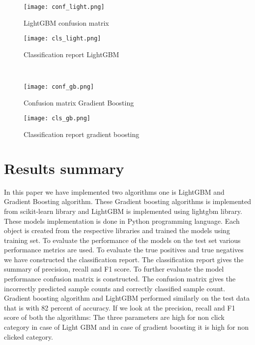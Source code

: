 \documentclass[conference]{IEEEtran}
\begin{document}
\begin{figure}[!ht]
     \centering
     \texttt{[image: conf\_light.png]}
     \caption{LightGBM confusion matrix}
     \label{fig:8}
 \end{figure}


\begin{figure}[!h]
     \centering
     \texttt{[image: cls\_light.png]}
     \caption{Classification report LightGBM }
     \label{fig:8}
 \end{figure}
 
\\

\begin{figure}[!h]
     \centering
     \texttt{[image: conf\_gb.png]}
     \caption{Confusion matrix Gradient Boosting}
     \label{fig:8}
 \end{figure}
 
 
 
  \begin{figure}[!ht]
     \centering
     \texttt{[image: cls\_gb.png]}
     \caption{Classification report gradient boosting}
     \label{fig:8}
 \end{figure}


 
\newpage
\section{Results summary}
In this paper we have implemented two algorithms one is LightGBM and Gradient Boosting algorithm. These Gradient boosting  algorithms is implemented from scikit-learn library and LightGBM is implemented using lightgbm library. These models implementation is done in Python programming language. Each object is created from the respective libraries and trained the models using training set.
To evaluate the performance of the models on the test set various performance metrics are used. To evaluate the true positives and true negatives we have constructed the classification report. The classification report gives the summary of precision, recall and F1 score.
To further evaluate the model performance confusion matrix is constructed. The confusion matrix gives the incorrectly predicted sample counts and correctly classified sample count.
Gradient boosting algorithm and LightGBM performed similarly on the test data that is with 82 percent of accuracy. If we look at the precision, recall and F1 score of both the algorithms: The three parameters are high for non click category in case of Light GBM and in case of gradient boosting it is high for non clicked category.


\newpage{}


\end{document}

